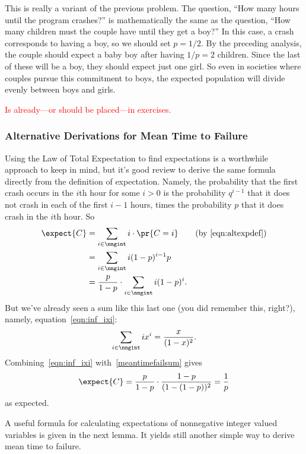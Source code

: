 This is really a variant of the previous problem.  The question, ``How
many hours until the program crashes?'' is mathematically the same as
the question, ``How many children must the couple have until they get
a boy?''  In this case, a crash corresponds to having a boy, so we
should set $p = 1/2$.  By the preceding analysis, the couple should
expect a baby boy after having $1/p = 2$ children.  Since the last of
these will be a boy, they should expect just one girl.  So even in
societies where couples pursue this commitment to boys, the expected
population will divide evenly between boys and girls.

\begin{editingnotes}

\textcolor{red}{Is already---or should be placed---in exercises.}

\subsubsection*{Alternative Derivations for Mean Time to Failure}
Using the Law of Total Expectation to find expectations is a worthwhile
approach to keep in mind, but it's good review to derive the same
formula directly from the definition of expectation.  Namely, the
probability that the first crash occurs in the $i$th hour for some $i
>0$ is the probability $q^{i-1}$ that it does not crash in each
of the first $i-1$ hours, times the probability $p$ that it does
crash in the $i$th hour.  So
\begin{align}
\expect{C} & = \sum_{i \in \nngint} i \cdot \pr{C=i}
               & \text{(by~\eqref{eqn:altexpdef})}\notag\\
           & = \sum_{i \in \nngint} i (1-p)^{i-1}p\notag\\
           &= \frac{p}{1-p} \cdot \sum_{i \in \nngint} i (1-p)^i.\label{meantimefailsum}
\end{align}
But we've already seen a sum like this last one (you did remember
this, right?), namely, equation~\eqref{eqn:inf_ixi}:
\[
\sum_{i \in \nngint} ix^i =\frac{x}{(1-x)^2}.
\]
Combining~\eqref{eqn:inf_ixi} with~\eqref{meantimefailsum} gives
\[
\expect{C} = \frac{p}{1-p} \cdot \frac{1-p}{(1-(1-p))^2} = \frac{1}{p}
\]
as expected.

A useful formula for calculating expectations of nonnegative integer
valued variables is given in the next lemma.  It yields still another
simple way to derive mean time to failure.


\end{editingnotes}
